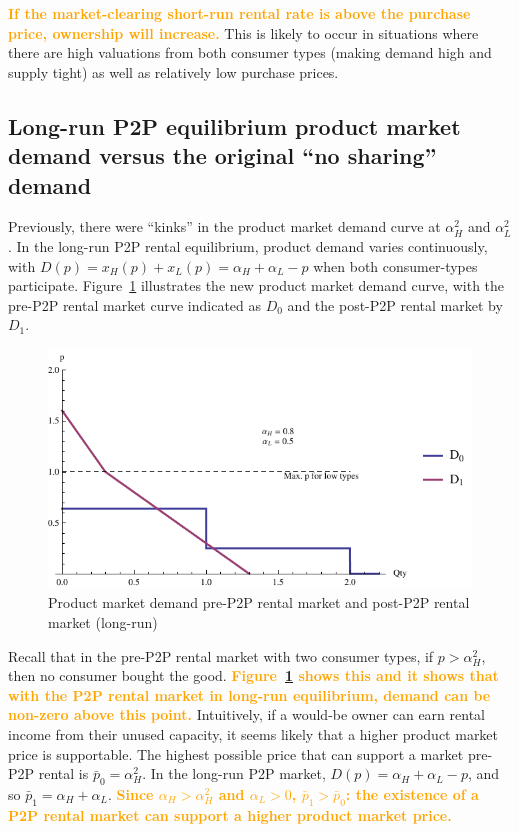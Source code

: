 \documentclass[11pt]{article}
\newcommand{\important}[1]{\textcolor{orange}{\textbf{#1}}}
\newcommand{\important}[1]{#1}
\begin{document}
\important{If the market-clearing short-run rental rate is above the purchase price, ownership will increase.}
This is likely to occur in situations where there are high valuations from both consumer types (making demand high and supply tight) as well as relatively low purchase prices. 

\subsection{Long-run P2P equilibrium product market demand versus the original ``no sharing'' demand} 
Previously, there were ``kinks'' in the product market demand curve at $\alpha_H^2$ and $\alpha_L^2$. 
In the long-run P2P rental equilibrium, product demand varies continuously, with $D(p) = x_H(p) + x_L(p) = \alpha_H + \alpha_L - p$ when both consumer-types participate. 
Figure~\ref{fig:demand} illustrates the new product market demand curve, with the pre-P2P rental market curve indicated as $D_0$ and the post-P2P rental market by $D_1$. 

\begin{figure}
\caption{Product market demand pre-P2P rental market and post-P2P rental market (long-run)}
\label{fig:demand} 
\centering
\includegraphics[scale = 1]{./diagrams/p2plr_demand.pdf}
\end{figure} 

Recall that in the pre-P2P rental market with two consumer types, if $p > \alpha_H^2$, then no consumer bought the good. 
\important{Figure~\ref{fig:demand} shows this and it shows that with the P2P rental market in long-run equilibrium, demand can be non-zero above this point.}  
Intuitively, if a would-be owner can earn rental income from their unused capacity, it seems likely that a higher product market price is supportable. 
The highest possible price that can support a market pre-P2P rental is $\bar{p}_0 = \alpha_H^2$.  
In the long-run P2P market, $D(p) = \alpha_H + \alpha_L - p$, and so $\bar{p}_{1} = \alpha_H + \alpha_L$. 
\important{Since $\alpha_H > \alpha_H^2$ and $\alpha_L > 0$, $\bar{p}_1 > \bar{p}_0$: the existence of a P2P rental market can support a higher product market price.} 
\end{document}
